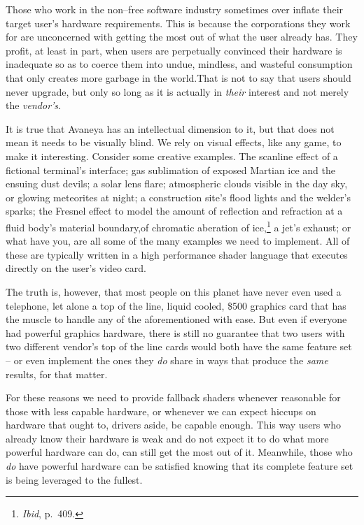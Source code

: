Those who work in the non--free software industry sometimes over inflate their target user's hardware requirements. This is because the corporations they work for are unconcerned with getting the most out of what the user already has. They profit, at least in part, when users are perpetually convinced their hardware is inadequate so as to coerce them into undue, mindless, and wasteful consumption that only creates more garbage in the world. That is not to say that users should never upgrade, but only so long as it is actually in {\it their} interest and not merely the {\it vendor's}.
    {}

It is true that Avaneya has an intellectual dimension to it, but that does not mean it needs to be visually blind. We rely on visual effects, like any game, to make it interesting. Consider some creative examples. The scanline effect of a fictional terminal's interface; gas sublimation of exposed Martian ice and the ensuing dust devils; a solar lens flare; atmospheric  clouds visible in the day sky, or glowing meteorites at night; a construction site's flood lights and the welder's sparks; the Fresnel effect to model the amount of reflection and refraction at a fluid body's material boundary, of chromatic aberation of ice,\footnote{{\it Ibid}, p.~409.} a jet's exhaust; or what have you, are all some of the many examples we need to implement. All of these are typically written in a high performance shader language that executes directly on the user's video card.

The truth is, however, that most people on this planet have never even used a telephone, let alone a top of the line, liquid cooled, \$500 graphics card that has the muscle to handle any of the aforementioned with ease. But even if everyone had powerful graphics hardware, there is still no guarantee that two users with two different vendor's top of the line cards would both have the same feature set -- or even implement the ones they {\it do} share in ways that produce the {\it same} results, for that matter. 

For these reasons we need to provide fallback shaders whenever reasonable for those with less capable hardware, or whenever we can expect hiccups on hardware that ought to, drivers aside, be capable enough. This way users who already know their hardware is weak and do not expect it to do what more powerful hardware can do, can still get the most out of it. Meanwhile, those who {\it do} have powerful hardware can be satisfied knowing that its complete feature set is being leveraged to the fullest.

